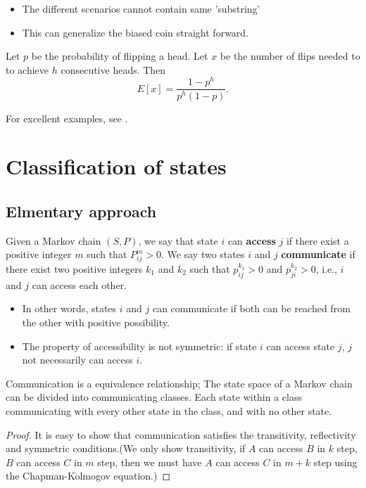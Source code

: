 \begin{refsection}
\begin{remark}\hfill
	\begin{itemize}
		\item The different scenarios cannot contain same 'substring'
		\item This can generalize the biased coin straight forward. 
	\end{itemize}
\end{remark}

\begin{lemma}
	Let $p$ be the probability of flipping a head. Let $x$ be the number of flips needed to to achieve $h$ consecutive heads. Then 
	$$E[x] = \frac{1-p^h}{p^h(1-p)}.$$
\end{lemma}

\begin{remark}
	For excellent examples, see \cite[110]{zhou2008practical}.
\end{remark}


\section{Classification of states}
\subsection{Elmentary approach}
\begin{definition}
\cite[235]{luenberger1979introduction}Given a Markov chain $(S,P)$, we say that state $i$ can \textbf{access} $j$ if there exist a positive integer $m$ such that $P^m_{ij} >0$. We say two states $i$ and $j$ \textbf{communicate} if there exist two positive integers $k_1$ and $k_2$ such that $p^{k_1}_{ij} > 0$ and $p^{k_2}_{ji} > 0$, i.e., $i$ and $j$ can access each other.
\end{definition}
\begin{remark}\hfill
\begin{itemize}
    \item In other words, states $i$ and $j$ can communicate if both can be reached from the other with positive possibility. 
    \item The property of accessibility is not symmetric: if state $i$ can access state $j$, $j$ not necessarily can access $i$.
\end{itemize}
\end{remark}
\smallskip


\begin{lemma}
Communication is a equivalence relationship; The state space of a Markov chain can be divided into communicating classes. Each state within a class communicating with every other state in the class, and with no other state. 
\end{lemma}
\begin{proof}
It is easy to show that communication satisfies the transitivity, reflectivity and symmetric conditions.(We only show transitivity, if $A$ can access $B$ in $k$ step, $B$ can access $C$ in $m$ step, then we must have $A$ can access $C$ in $m+k$ step using the Chapman-Kolmogov equation.)  
\end{proof}



\end{refsection}
